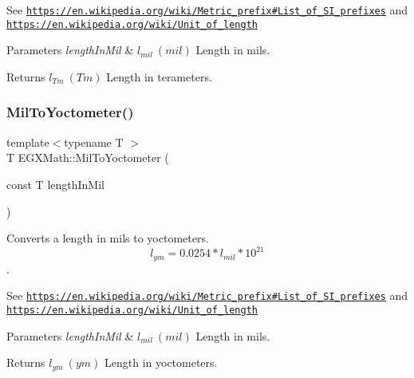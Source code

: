 See \href{https://en.wikipedia.org/wiki/Metric_prefix#List_of_SI_prefixes}{\tt https\+://en.\+wikipedia.\+org/wiki/\+Metric\+\_\+prefix\#\+List\+\_\+of\+\_\+\+S\+I\+\_\+prefixes} and \href{https://en.wikipedia.org/wiki/Unit_of_length}{\tt https\+://en.\+wikipedia.\+org/wiki/\+Unit\+\_\+of\+\_\+length} 
\begin{DoxyParams}{Parameters}
{\em length\+In\+Mil} & $ l_{mil}\ (mil)$ Length in mils. \\
\hline
\end{DoxyParams}
\begin{DoxyReturn}{Returns}
$ l_{Tm}\ (Tm)$ Length in terameters. 
\end{DoxyReturn}
\mbox{\label{group___e_g_x_math-_conversions-_length_conversions-_imperial-_mil-_s_i_ga1420821a520a74457ec9d8dfe7ce1678}} 
\subsubsection{\texorpdfstring{Mil\+To\+Yoctometer()}{MilToYoctometer()}}
{\footnotesize\ttfamily template$<$typename T $>$ \\
T E\+G\+X\+Math\+::\+Mil\+To\+Yoctometer (\begin{DoxyParamCaption}\item[{const T}]{length\+In\+Mil }\end{DoxyParamCaption})}



Converts a length in mils to yoctometers. \[ l_{ym}=0.0254 * l_{mil} * 10^{21} \]. 

See \href{https://en.wikipedia.org/wiki/Metric_prefix#List_of_SI_prefixes}{\tt https\+://en.\+wikipedia.\+org/wiki/\+Metric\+\_\+prefix\#\+List\+\_\+of\+\_\+\+S\+I\+\_\+prefixes} and \href{https://en.wikipedia.org/wiki/Unit_of_length}{\tt https\+://en.\+wikipedia.\+org/wiki/\+Unit\+\_\+of\+\_\+length} 
\begin{DoxyParams}{Parameters}
{\em length\+In\+Mil} & $ l_{mil}\ (mil)$ Length in mils. \\
\hline
\end{DoxyParams}
\begin{DoxyReturn}{Returns}
$ l_{ym}\ (ym)$ Length in yoctometers. 
\end{DoxyReturn}
\mbox{\label{group___e_g_x_math-_conversions-_length_conversions-_imperial-_mil-_s_i_gaa7be73e4efb8f962d8d7944cdeb842df}} 
